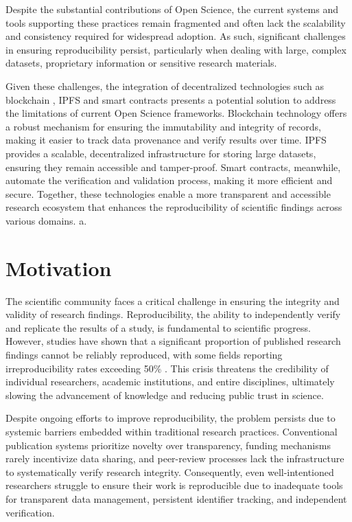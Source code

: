 \documentclass[final]{rc-book-2.14}
\begin{document}
Despite the substantial contributions of Open Science, the current systems and tools supporting these practices remain fragmented and often lack the scalability and consistency required for widespread adoption. As such, significant challenges in ensuring reproducibility persist, particularly when dealing with large, complex datasets, proprietary information  or sensitive research materials.

Given these challenges, the integration of decentralized technologies such as blockchain \cite{nakamoto2012bitcoin}, IPFS \cite{Benet} and smart contracts \cite{Szabo-1994}presents a potential solution to address the limitations of current Open Science frameworks. Blockchain technology offers a robust mechanism for ensuring the immutability and integrity of records, making it easier to track data provenance and verify results over time. IPFS provides a scalable, decentralized infrastructure for storing large datasets, ensuring they remain accessible and tamper-proof. Smart contracts, meanwhile, automate the verification and validation process, making it more efficient and secure. Together, these technologies enable a more transparent and accessible research ecosystem that enhances the reproducibility of scientific findings across various domains.
a.

\section{Motivation}
\label{chp:intro:sec:motivation}

The scientific community faces a critical challenge in ensuring the integrity and validity of research findings. Reproducibility, the ability to independently verify and replicate the results of a study, is fundamental to scientific progress. However, studies have shown that a significant proportion of published research findings cannot be reliably reproduced, with some fields reporting irreproducibility rates exceeding 50\% \cite{baker2016reproducibility}. This crisis threatens the credibility of individual researchers, academic institutions, and entire disciplines, ultimately slowing the advancement of knowledge and reducing public trust in science.

Despite ongoing efforts to improve reproducibility, the problem persists due to systemic barriers embedded within traditional research practices. Conventional publication systems prioritize novelty over transparency, funding mechanisms rarely incentivize data sharing, and peer-review processes lack the infrastructure to systematically verify research integrity. Consequently, even well-intentioned researchers struggle to ensure their work is reproducible due to inadequate tools for transparent data management, persistent identifier tracking, and independent verification.
\end{document}
